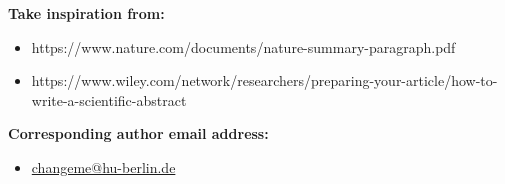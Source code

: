 \textbf{Take inspiration from:}
\begin{itemize}
    \item https://www.nature.com/documents/nature-summary-paragraph.pdf
    \item https://www.wiley.com/network/researchers/preparing-your-article/how-to-write-a-scientific-abstract
\end{itemize}

\vspace{2cm}
\textbf{Corresponding author email address:}
\begin{itemize}
	\item \href{mailto:changeme@hu-berlin.de}{changeme@hu-berlin.de}
\end{itemize}

